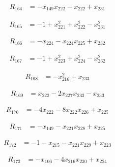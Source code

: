 \documentclass[11pt,letterpaper]{article}
\theoremstyle{definition}
\theoremstyle{remark}
\begin{document}
\begin{align*}
R_{164} &= -x_{149} x_{222} -x_{222} +x_{231}
\end{align*}

\begin{align*}
R_{165} &= -1 +x_{221}^{2} +x_{222}^{2} -x_{231}^{2}
\end{align*}

\begin{align*}
R_{166} &= -x_{224} -x_{224} x_{225} +x_{232}
\end{align*}

\begin{align*}
R_{167} &= -1 +x_{223}^{2} +x_{224}^{2} -x_{232}^{2}
\end{align*}

\begin{align*}
R_{168} &= -x_{216}^{2} +x_{233}
\end{align*}

\begin{align*}
R_{169} &= x_{222} -2 x_{227} x_{233} -x_{233}
\end{align*}

\begin{align*}
R_{170} &= -4 x_{222} -8 x_{222} x_{226} +x_{225}
\end{align*}

\begin{align*}
R_{171} &= -x_{149} -x_{221} x_{228} +x_{225}
\end{align*}

\begin{align*}
R_{172} &= -1 -x_{215} -x_{221} x_{229} +x_{223}
\end{align*}

\begin{align*}
R_{173} &= -x_{106} -4 x_{216} x_{230} +x_{224}
\end{align*}
\end{document}
